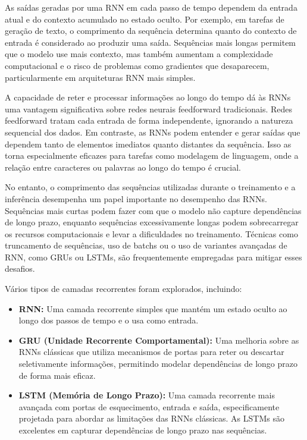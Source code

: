 \documentclass[a4paper,12pt]{article}
\begin{document}
As saídas geradas por uma RNN em cada passo de tempo dependem da entrada atual e do contexto acumulado no estado oculto. Por exemplo, em tarefas de geração de texto, o comprimento da sequência determina quanto do contexto de entrada é considerado ao produzir uma saída. Sequências mais longas permitem que o modelo use mais contexto, mas também aumentam a complexidade computacional e o risco de problemas como gradientes que desaparecem, particularmente em arquiteturas RNN mais simples.

A capacidade de reter e processar informações ao longo do tempo dá às RNNs uma vantagem significativa sobre redes neurais feedforward tradicionais. Redes feedforward tratam cada entrada de forma independente, ignorando a natureza sequencial dos dados. Em contraste, as RNNs podem entender e gerar saídas que dependem tanto de elementos imediatos quanto distantes da sequência. Isso as torna especialmente eficazes para tarefas como modelagem de linguagem, onde a relação entre caracteres ou palavras ao longo do tempo é crucial.

No entanto, o comprimento das sequências utilizadas durante o treinamento e a inferência desempenha um papel importante no desempenho das RNNs. Sequências mais curtas podem fazer com que o modelo não capture dependências de longo prazo, enquanto sequências excessivamente longas podem sobrecarregar os recursos computacionais e levar a dificuldades no treinamento. Técnicas como truncamento de sequências, uso de batchs ou o uso de variantes avançadas de RNN, como GRUs ou LSTMs, são frequentemente empregadas para mitigar esses desafios.

Vários tipos de camadas recorrentes foram explorados, incluindo:
\begin{itemize}
\item \textbf{RNN:} Uma camada recorrente simples que mantém um estado oculto ao longo dos passos de tempo e o usa como entrada.
\item \textbf{GRU (Unidade Recorrente Comportamental):} Uma melhoria sobre as RNNs clássicas que utiliza mecanismos de portas para reter ou descartar seletivamente informações, permitindo modelar dependências de longo prazo de forma mais eficaz.
\item \textbf{LSTM (Memória de Longo Prazo):} Uma camada recorrente mais avançada com portas de esquecimento, entrada e saída, especificamente projetada para abordar as limitações das RNNs clássicas. As LSTMs são excelentes em capturar dependências de longo prazo nas sequências.
\end{itemize}
\end{document}
